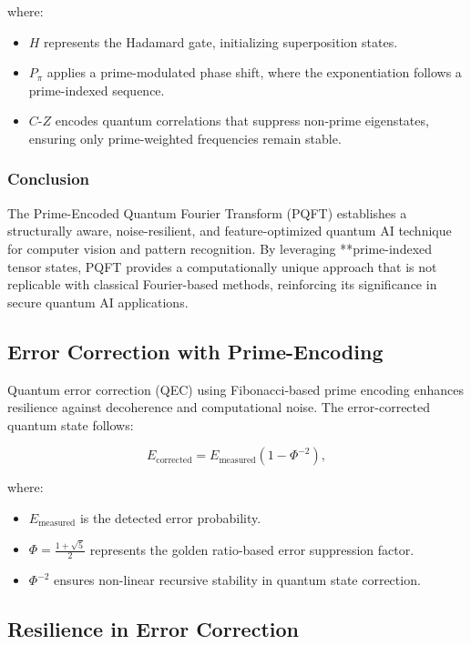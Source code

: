 \documentclass{article}
\theoremstyle{plain}
\begin{document}
\begin{itemize}
\begin{itemize}
where:
\begin{itemize}
    \item $H$ represents the Hadamard gate, initializing superposition states.
    \item $P_{\pi}$ applies a prime-modulated phase shift, where the exponentiation follows a prime-indexed sequence.
    \item $C\text{-}Z$ encodes quantum correlations that suppress non-prime eigenstates, ensuring only prime-weighted frequencies remain stable.
\end{itemize}

\subsubsection{Conclusion}
The Prime-Encoded Quantum Fourier Transform (PQFT) establishes a structurally aware, noise-resilient, and feature-optimized quantum AI technique for computer vision and pattern recognition. By leveraging **prime-indexed tensor states, PQFT provides a computationally unique approach that is not replicable with classical Fourier-based methods, reinforcing its significance in secure quantum AI applications.


\subsection{Error Correction with Prime-Encoding}

Quantum error correction (QEC) using Fibonacci-based prime encoding enhances resilience against decoherence and computational noise. The error-corrected quantum state follows:

\begin{equation}
E_{\text{corrected}} = E_{\text{measured}}(1 - \Phi^{-2}),
\end{equation}

where:
\begin{itemize}
    \item $E_{\text{measured}}$ is the detected error probability.
    \item $\Phi = \frac{1+\sqrt{5}}{2}$ represents the golden ratio-based error suppression factor.
    \item $\Phi^{-2}$ ensures non-linear recursive stability in quantum state correction.
\end{itemize}

\subsection{Resilience in Error Correction}


\end{itemize}
\end{itemize}
\end{document}
